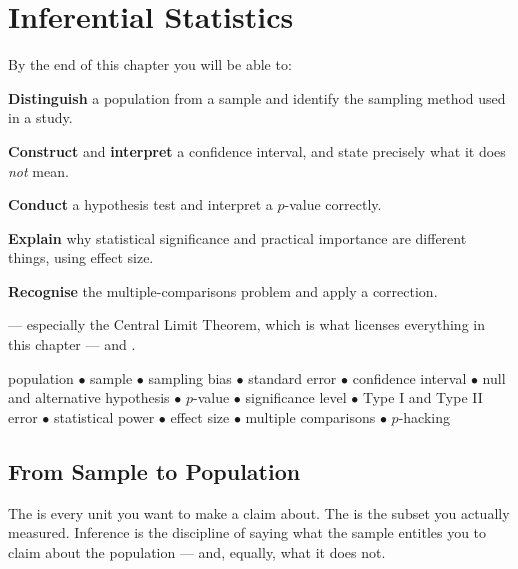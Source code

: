 \chapter{Inferential Statistics}\label{ch:inference}

\begin{outcomes}
By the end of this chapter you will be able to:
\begin{tight}
  \item \textbf{Distinguish} a population from a sample and identify the sampling method used in a study.
  \item \textbf{Construct} and \textbf{interpret} a confidence interval, and state precisely what it does \emph{not} mean.
  \item \textbf{Conduct} a hypothesis test and interpret a $p$-value correctly.
  \item \textbf{Explain} why statistical significance and practical importance are different things, using effect size.
  \item \textbf{Recognise} the multiple-comparisons problem and apply a correction.
\end{tight}
\end{outcomes}

\begin{prereq}
 --- especially the Central Limit Theorem, which is what licenses
everything in this chapter --- and .
\end{prereq}

\begin{keyterms}
population $\bullet$ sample $\bullet$ sampling bias $\bullet$ standard error
$\bullet$ confidence interval $\bullet$ null and alternative hypothesis $\bullet$
$p$-value $\bullet$ significance level $\bullet$ Type I and Type II error $\bullet$
statistical power $\bullet$ effect size $\bullet$ multiple comparisons $\bullet$
$p$-hacking
\end{keyterms}

\section{From Sample to Population}

\begin{definitionbox}
The  is every unit you want to make a claim about. The
 is the subset you actually measured. Inference is the discipline of
saying what the sample entitles you to claim about the population --- and, equally,
what it does not.
\end{definitionbox}

